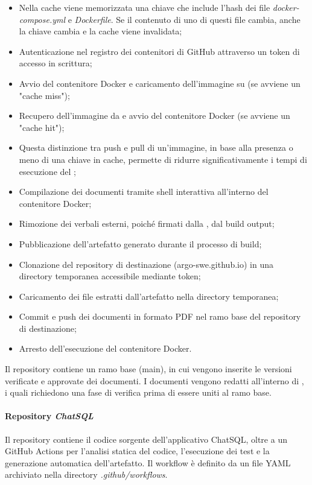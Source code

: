 \begin{itemize}
\begin{itemize}
    \item Nella cache viene memorizzata una chiave che include l'hash dei file \emph{docker-compose.yml} e \emph{Dockerfile}. Se il contenuto di uno di questi file cambia, anche la chiave cambia e la cache viene invalidata;
    \item Autenticazione nel registro dei contenitori di GitHub attraverso un token di accesso in scrittura;
    \item Avvio del contenitore Docker e caricamento dell'immagine su  (se avviene un "cache miss");
    \item Recupero dell'immagine da  e avvio del contenitore Docker (se avviene un "cache hit");
    \item Questa distinzione tra push e pull di un'immagine, in base alla presenza o meno di una chiave in cache, permette di ridurre significativamente i tempi di esecuzione del ;
    \item Compilazione dei documenti tramite shell interattiva all'interno del contenitore Docker;
    \item Rimozione dei verbali esterni, poiché firmati dalla , dal build output;
    \item Pubblicazione dell'artefatto generato durante il processo di build;
    \item Clonazione del repository di destinazione (argo-swe.github.io) in una directory temporanea accessibile mediante token;
    \item Caricamento dei file estratti dall'artefatto nella directory temporanea;
    \item Commit e push dei documenti in formato PDF nel ramo base del repository di destinazione;
    \item Arresto dell'esecuzione del contenitore Docker.
  \end{itemize}
\end{itemize}
Il repository contiene un ramo base (main), in cui vengono inserite le versioni verificate e approvate dei documenti. I documenti vengono redatti all'interno di , i quali richiedono una fase di verifica prima di essere uniti al ramo base.

\paragraph{Repository \emph{ChatSQL}}
Il repository contiene il codice sorgente dell'applicativo ChatSQL, oltre a un  GitHub Actions per l'analisi statica del codice, l'esecuzione dei test e la generazione automatica dell'artefatto. Il workflow è definito da un file YAML archiviato nella directory \emph{.github/workflows}.

